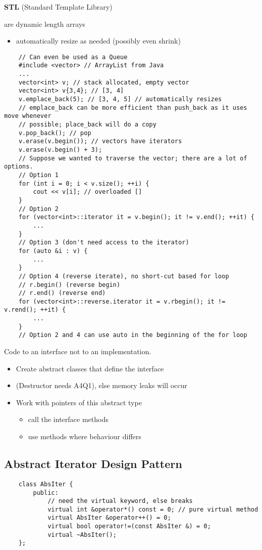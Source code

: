 \textbf{STL} (Standard Template Library)

 are dynamic length arrays
\begin{itemize}
    \item automatically resize as needed (possibly even shrink)
\end{itemize}

\begin{lstlisting}
    // Can even be used as a Queue
    #include <vector> // ArrayList from Java
    ...
    vector<int> v; // stack allocated, empty vector
    vector<int> v{3,4}; // [3, 4]
    v.emplace_back(5); // [3, 4, 5] // automatically resizes
    // emplace_back can be more efficient than push_back as it uses move whenever
    // possible; place_back will do a copy
    v.pop_back(); // pop
    v.erase(v.begin()); // vectors have iterators
    v.erase(v.begin() + 3);
    // Suppose we wanted to traverse the vector; there are a lot of options.
    // Option 1
    for (int i = 0; i < v.size(); ++i) {
        cout << v[i]; // overloaded []
    }
    // Option 2
    for (vector<int>::iterator it = v.begin(); it != v.end(); ++it) {
        ...
    }
    // Option 3 (don't need access to the iterator)
    for (auto &i : v) {
        ...
    }
    // Option 4 (reverse iterate), no short-cut based for loop
    // r.begin() (reverse begin)
    // r.end() (reverse end)
    for (vector<int>::reverse.iterator it = v.rbegin(); it != v.rend(); ++it) {
        ...
    }
    // Option 2 and 4 can use auto in the beginning of the for loop
\end{lstlisting}

Code to an interface not to an implementation.
\begin{itemize}
    \item Create abstract classes that define the interface
    \item (Destructor needs  A4Q1), else memory leaks will occur
    \item Work with pointers of this abstract type
          \begin{itemize}
              \item call the interface methods
              \item use  methods where behaviour differs
          \end{itemize}
\end{itemize}

\subsection{Abstract Iterator Design Pattern}
\begin{lstlisting}
    class AbsIter {
        public:
            // need the virtual keyword, else breaks
            virtual int &operator*() const = 0; // pure virtual method
            virtual AbsIter &operator++() = 0;
            virtual bool operator!=(const AbsIter &) = 0;
            virtual ~AbsIter();
    };
\end{lstlisting}

